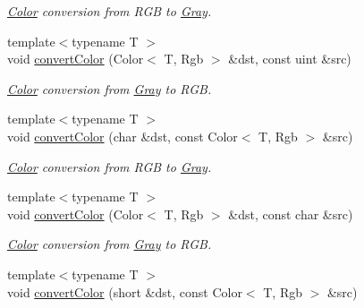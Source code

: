 \begin{DoxyCompactItemize}
\begin{DoxyCompactList}\small\item\em \hyperlink{class_d_o_1_1_color}{Color} conversion from R\-G\-B to \hyperlink{struct_d_o_1_1_gray}{Gray}. \end{DoxyCompactList}\item 
\hypertarget{group___color_conversion_ga1b0388fd6e73f47cd74f29fd57a3547b}{{\footnotesize template$<$typename T $>$ }\\void \hyperlink{group___color_conversion_ga1b0388fd6e73f47cd74f29fd57a3547b}{convert\-Color} (Color$<$ T, Rgb $>$ \&dst, const uint \&src)}\label{group___color_conversion_ga1b0388fd6e73f47cd74f29fd57a3547b}

\begin{DoxyCompactList}\small\item\em \hyperlink{class_d_o_1_1_color}{Color} conversion from \hyperlink{struct_d_o_1_1_gray}{Gray} to R\-G\-B. \end{DoxyCompactList}\item 
\hypertarget{group___color_conversion_ga041e47dda16f0e33819de35b60fdff22}{{\footnotesize template$<$typename T $>$ }\\void \hyperlink{group___color_conversion_ga041e47dda16f0e33819de35b60fdff22}{convert\-Color} (char \&dst, const Color$<$ T, Rgb $>$ \&src)}\label{group___color_conversion_ga041e47dda16f0e33819de35b60fdff22}

\begin{DoxyCompactList}\small\item\em \hyperlink{class_d_o_1_1_color}{Color} conversion from R\-G\-B to \hyperlink{struct_d_o_1_1_gray}{Gray}. \end{DoxyCompactList}\item 
\hypertarget{group___color_conversion_gaef965f101a5d8240f27f144dd810e5fd}{{\footnotesize template$<$typename T $>$ }\\void \hyperlink{group___color_conversion_gaef965f101a5d8240f27f144dd810e5fd}{convert\-Color} (Color$<$ T, Rgb $>$ \&dst, const char \&src)}\label{group___color_conversion_gaef965f101a5d8240f27f144dd810e5fd}

\begin{DoxyCompactList}\small\item\em \hyperlink{class_d_o_1_1_color}{Color} conversion from \hyperlink{struct_d_o_1_1_gray}{Gray} to R\-G\-B. \end{DoxyCompactList}\item 
\hypertarget{group___color_conversion_ga1e5a93ec87d6a83ace06fdf2db0444b1}{{\footnotesize template$<$typename T $>$ }\\void \hyperlink{group___color_conversion_ga1e5a93ec87d6a83ace06fdf2db0444b1}{convert\-Color} (short \&dst, const Color$<$ T, Rgb $>$ \&src)}\label{group___color_conversion_ga1e5a93ec87d6a83ace06fdf2db0444b1}


\end{DoxyCompactItemize}
